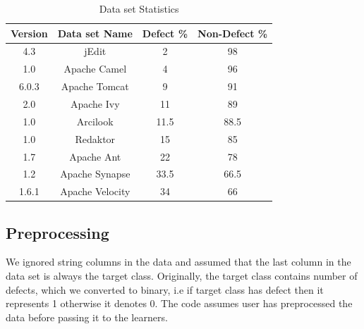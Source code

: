 \documentclass[sigconf,review, anonymous]{acmart}
\theoremstyle{break}
\theoremstyle{break}
\begin{document}
 \begin{table}[!htbp]
\begin{center}
\begin{tabular}{|c|c|c|c|}
\hline 
\textbf{Version} & \textbf{Data set Name} &  \textbf{Defect \%} & \textbf{Non-Defect \%}\\[0.5ex]
\hline
4.3 & jEdit & 2 & 98 \\
\hline
1.0 & Apache Camel & 4 & 96 \\ 
\hline
6.0.3 & Apache Tomcat & 9 & 91 \\
\hline
2.0 & Apache Ivy & 11 & 89 \\ 
\hline
1.0 & Arcilook & 11.5 & 88.5\\
\hline
1.0 & Redaktor & 15 & 85 \\
\hline
1.7 & Apache Ant & 22 & 78 \\ 
\hline
1.2 & Apache Synapse & 33.5 & 66.5 \\
\hline
1.6.1 & Apache Velocity & 34 & 66 \\
\hline
\end{tabular}
\end{center}
\caption{Data set Statistics}
\label{tb:dataset}
\end{table}

\subsection{\textbf{Preprocessing}}
 We ignored  string columns in the data and assumed that the last column in the data set is always the target class. Originally, the target class contains number of defects, which we converted to binary, i.e if target class has defect then it represents 1 otherwise it denotes 0. The code assumes user has preprocessed the data before passing it to the learners. 
\end{document}
